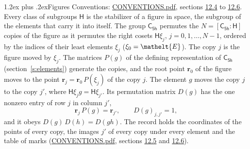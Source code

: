 \documentclass[10pt,a4paper]{article}
\makeatletter
\renewcommand\section{\@startsection{section}{1}{\z@}{-3ex plus -1ex minus -.2ex}%
  {1.2ex plus .2ex}{\normalfont\large\sffamily\bfseries\color{parttitle}}}
\numberwithin{equation}{section}
\newcommand{\eltfont}[1]{{\let\sigma\eltsigma\mathelt{#1}}}
\newcommand{\grp}[1]{\mathsf{#1}}
\newcommand{\cls}[1]{\eltfont{#1}}
\newcommand{\pointr}{\mathbf{r}}
\makeatother
\begin{document}
\section{Figures}\label{s:permutation}
Conventions: \href{../../CONVENTIONS.pdf}{CONVENTIONS.pdf}, sections \href{../../CONVENTIONS.pdf\#conv.12.4}{12.4} to \href{../../CONVENTIONS.pdf\#conv.12.6}{12.6}.
Every class of subgroups $\grp{H}$ is the stabilizer of a figure in space, the subgroup of the elements that carry it into itself. \label{n:local.orbit.size}\label{n:element.coset.least}\label{n:index.coset}The group $\grp{C_{5h}}$ permutes the $N = [\grp{C_{5h}} : \grp{H}]$ copies of the figure as it permutes the right cosets $\grp{H}\xi_j$, $j = 0, 1, \dots, N - 1$, ordered by the indices of their least elements $\xi_j$ ($\xi_0 = \cls{E}$). The copy $j$ is the figure moved by $\xi_j$. The matrices $P(g)$ of the defining representation of $\grp{C_{5h}}$ (section~\ref{s:elements}) generate the copies, and the root point $\pointr_0$ of the figure moves to the point $\pointr_j = \pointr_0\, P(\xi_j)$ of the copy $j$. \label{n:local.coset.image}The element $g$ moves the copy $j$ to the copy $j'$, where $\grp{H}\xi_j g = \grp{H}\xi_{j'}$. \label{n:local.matrix.permutation}Its permutation matrix $D(g)$ has the one nonzero entry of row $j$ in column $j'$,
\begin{equation}\label{e:perm.matrix}\pointr_j\, P(g) = \pointr_{j'}, \qquad D(g)_{j,j'} = 1,\end{equation}
and it obeys $D(g)\, D(h) = D(gh)$. The record holds the coordinates of the points of every copy, the images $j'$ of every copy under every element and the table of marks (\href{../../CONVENTIONS.pdf}{CONVENTIONS.pdf}, sections \href{../../CONVENTIONS.pdf\#conv.12.5}{12.5} and \href{../../CONVENTIONS.pdf\#conv.12.6}{12.6}).
\end{document}
